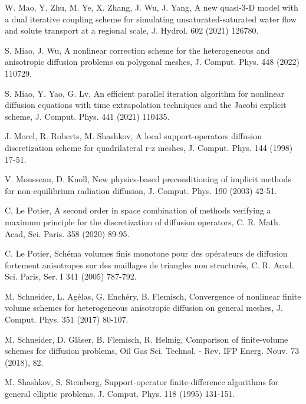 \documentclass[times,review,preprint,authoryear]{elsarticle}
\begin{document}
\begin{thebibliography}{100}
W. Mao, Y. Zhu, M. Ye, X. Zhang, J. Wu, J. Yang,
A new quasi-3-D model with a dual iterative coupling scheme for simulating unsaturated-saturated water flow and solute transport at a regional scale,
J. Hydrol. 602 (2021) 126780.


S. Miao, J. Wu, A nonlinear correction scheme for the heterogeneous and anisotropic diffusion problems on polygonal meshes, J. Comput. Phys. 448 (2022) 110729.


S. Miao, Y. Yao, G. Lv, An efficient parallel iteration algorithm for nonlinear diffusion equations with time extrapolation techniques and the Jacobi explicit scheme, J. Comput. Phys. 441 (2021) 110435.

J. Morel, R. Roberts, M. Shashkov, A local support-operators diffusion discretization scheme for quadrilateral r-z meshes, J. Comput. Phys. 144 (1998) 17-51.

V. Mousseau, D. Knoll, New physics-based preconditioning of implicit methods for non-equilibrium radiation diffusion, J. Comput. Phys. 190 (2003) 42-51.


C. Le Potier,  A second order in space combination of methods verifying a maximum principle for the discretization of diffusion operators, C. R. Math. Acad, Sci. Paris.  {\color{black}358} (2020) 89-95.

 C. Le Potier, Sch{\color{black}\'e}ma volumes finis monotone pour des op{\color{black}\'e}rateurs de diffusion fortement anisotropes sur des maillages de triangle{\color{black}s} non structur{\color{black}\'e}s, {\color{black}C. R. Acad. Sci. Paris, Ser. I} 341 (2005) 787-792.



M. Schneider, L. Ag{\color{black}\'e}las, G. Ench{\color{black}\'e}ry, B. Flemisch, Convergence of nonlinear finite volume
schemes for heterogeneous anisotropic diffusion on general meshes, J. Comput. Phys. 351 (2017) 80-107.

{\color{black}
M. Schneider, D. Gl\"{a}ser, B. Flemisch, R. Helmig, Comparison of finite-volume schemes for diffusion problems, Oil Gas Sci. Technol. - Rev. IFP Energ. Nouv. 73 (2018), 82.}


M. Shashkov, S. Steinberg, Support-operator finite-difference algorithms for general elliptic problems, J. Comput. Phys. 118 (1995) 131-151.




\end{thebibliography}
\end{document}
